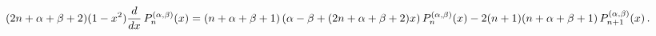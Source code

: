\[(2n+\alpha+\beta+2)(1-x^{2})\frac{d}{dx}\mathop{P^{(\alpha,\beta)}_{n}\/}%
\nolimits\!\left(x\right)=(n+\alpha+\beta+1)\left(\alpha-\beta+(2n+\alpha+%
\beta+2)x\right)\mathop{P^{(\alpha,\beta)}_{n}\/}\nolimits\!\left(x\right)-2(n%
+1)(n+\alpha+\beta+1)\mathop{P^{(\alpha,\beta)}_{n+1}\/}\nolimits\!\left(x%
\right).\]